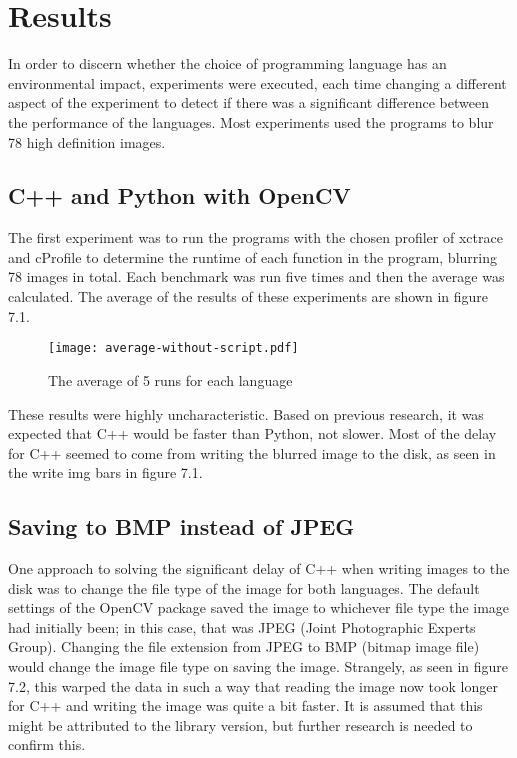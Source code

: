 \chapter{Results}
In order to discern whether the choice of programming language has an environmental impact, experiments were executed, each time changing a different aspect of the experiment to detect if there was a significant difference between the performance of the languages. Most experiments used the programs to blur 78 high definition images.

\section{C++ and Python with OpenCV }
The first experiment was to run the programs with the chosen profiler of xctrace and cProfile to determine the runtime of each function in the program, blurring 78 images in total. Each benchmark was run five times and then the average was calculated. The average of the results of these experiments are shown in figure 7.1.

\begin{figure}[H]
	\centering
	\texttt{[image: average-without-script.pdf]}
	\caption{The average of 5 runs for each language}
	\label{figure:average-78img}
\end{figure}

These results were highly uncharacteristic. Based on previous research, it was expected that C++ would be faster than Python, not slower. Most of the delay for C++ seemed to come from writing the blurred image to the disk, as seen in the write img bars in figure 7.1.

\section{Saving to BMP instead of JPEG}
One approach to solving the significant delay of C++ when writing images to the disk was to change the file type of the image for both languages. The default settings of the OpenCV package saved the image to whichever file type the image had initially been; in this case, that was JPEG (Joint Photographic Experts Group). Changing the file extension from JPEG to BMP (bitmap image file) would change the image file type on saving the image. Strangely, as seen in figure 7.2, this warped the data in such a way that reading the image now took longer for C++ and writing the image was quite a bit faster. It is assumed that this might be attributed to the library version, but further research is needed to confirm this.

